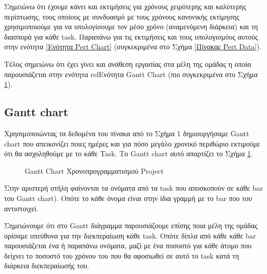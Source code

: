 \documentclass[12pt,a4paper]{article}
\begin{document}
Σημειώνω ότι έχουμε κάνει και εκτιμήσεις για χρόνους χειρότερης και καλύτερης περίπτωσης, τους οποίους με συνδυασμό με τους χρόνους κανονικής εκτίμησης χρησιμοποιούμε για να υπολογίσουμε τον μέσο χρόνο (αναμενόμενη διάρκεια) και τη διασπορά για κάθε task. Παραπάνω για τις εκτιμήσεις και τους υπολογισμόυς αυτούς στην ενότητα \ref{Ενότητα Pert Chart} (συγκεκριμένα στο Σχήμα \ref{Πίνακας Pert Data}).

Τέλος σημειώνω ότι έχει γίνει και ανάθεση εργασίας στα μέλη της ομάδας η οποία παρουσιάζεται στην ενότητα ref{Ενότητα Gantt Chart} (πιο συγκεκριμένα στο Σχήμα \ref{Gantt Chart Χρονοπρογραμματισμού Project}).

\subsection{Gantt chart}
\label{Ενότητα Gantt Chart}
Χρησιμοποιώντας τα δεδομένα του πίνακα από το Σχήμα 1 δημιουργήσαμε Gantt chart που απεικονίζει ποιες ημέρες και για πόσο μεγάλο χρονικό περιθώριο εκτιμούμε ότι θα ασχοληθούμε με το κάθε Task. Το Gantt chart αυτό απαρτίζει το Σχήμα \ref{Gantt Chart Χρονοπρογραμματισμού Project}.

\begin{figure}[H]
	\caption{Gantt Chart Χρονοπρογραμματισμού Project}
	\label{Gantt Chart Χρονοπρογραμματισμού Project}
\end{figure}

Στην αριστερή στήλη φαίνονται τα ονόματα από τα task που αποσκοπούν σε κάθε bar του Gantt chart). Οπότε το κάθε όνομα είναι στην ίδια γραμμή με το bar που του αντιστοιχεί.

Σημειώνουμε ότι στο Gantt διάγραμμα παρουσιάζουμε επίσης ποια μέλη της ομάδας ορίσαμε υπεύθυνα για την διεκπεραίωση κάθε task. Οπότε δίπλα από κάθε κάθε bar παρουσιάζεται ένα ή παραπάνω ονόματα, μαζί με ένα ποσοστό για κάθε άτομο που δείχνει το ποσοστό του χρόνου του που θα αφοσιωθεί σε αυτό το task κατά τη διάρκεια διεκπεραίωσής του.
\end{document}
